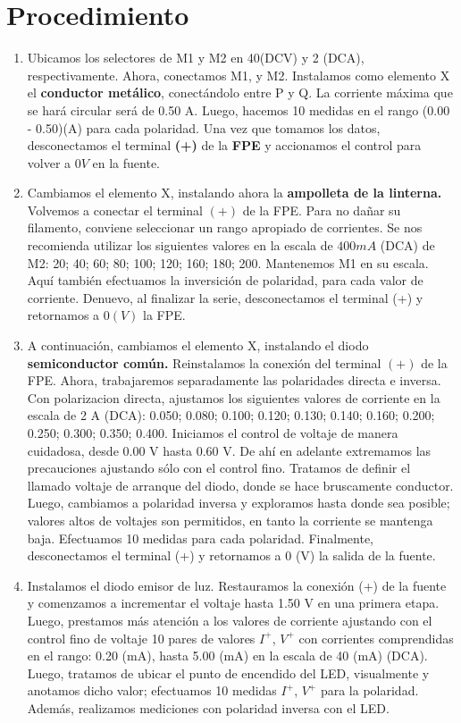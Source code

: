 \documentclass[]{article}
\begin{document}
\section{Procedimiento}
\begin{enumerate}

  \item  Ubicamos los selectores de M1 y M2 en 40(DCV) y 2 (DCA), respectivamente. Ahora, conectamos M1, y M2.
Instalamos como elemento X el \textbf{conductor metálico}, conectándolo entre P y Q. La corriente máxima que 
se hará circular será de 0.50 A. 
Luego, hacemos 10 medidas en el rango (0.00 - 0.50)(A) para cada polaridad. Una vez que tomamos los datos, desconectamos
el terminal \textbf{(+)} de la \textbf{FPE} y accionamos el control para volver a $0 V$ en la fuente. \\


\item Cambiamos el elemento X, instalando ahora la \textbf{ampolleta de la linterna.} Volvemos a conectar el terminal $(+)$ de la FPE. 
Para no dañar su filamento, conviene seleccionar un rango apropiado de corrientes. Se nos recomienda utilizar los
siguientes valores en la escala de $400 mA$ (DCA) de M2: 20; 40; 60; 80; 100; 120; 160; 180; 200. Mantenemos M1 en 
su escala. Aquí también efectuamos la inversición de polaridad, para cada valor de corriente. Denuevo, al finalizar la serie,
desconectamos el terminal (+) y retornamos a $0 (V)$ la FPE.

\item A continuación, cambiamos el elemento X, instalando el diodo \textbf{semiconductor común.} Reinstalamos la conexión
del terminal $(+)$ de la FPE. Ahora, trabajaremos separadamente las polaridades directa e inversa. Con polarizacion directa,
ajustamos los siguientes valores de corriente en la escala de 2 A (DCA): 0.050; 0.080; 0.100; 0.120; 0.130;
0.140; 0.160; 0.200; 0.250; 0.300; 0.350; 0.400. Iniciamos el control de voltaje de manera cuidadosa, desde 0.00 V hasta
0.60 V. De ahí en adelante extremamos las precauciones ajustando sólo con el control fino. Tratamos de definir el llamado
voltaje de arranque del diodo, donde se hace bruscamente conductor. Luego, cambiamos a polaridad inversa
y exploramos hasta donde sea posible; valores altos de voltajes son permitidos, en tanto la corriente se mantenga baja. Efectuamos 10 
medidas para cada polaridad. Finalmente, desconectamos el terminal (+) y retornamos a 0 (V) la salida de la fuente.


\item  Instalamos el diodo emisor de luz. Restauramos la conexión (+) de la fuente y comenzamos a incrementar el voltaje
hasta 1.50 V en una primera etapa. Luego, prestamos más atención a los valores de corriente ajustando con el control 
fino de voltaje 10 pares de valores $I^{+}$, $V^{+}$ con corrientes comprendidas en el rango: 0.20 (mA), hasta 5.00 (mA)
en la escala de 40 (mA) (DCA). Luego, tratamos de ubicar el punto de encendido del LED, visualmente y anotamos dicho valor; efectuamos
10 medidas $I^{+}$, $V^{+}$ para la polaridad. Además, realizamos mediciones con polaridad inversa con el LED. \\


\end{enumerate}
\end{document}
